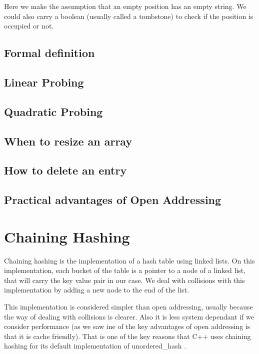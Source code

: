 Here we make the assumption that an empty position has an empty string. We could also carry a boolean (usually called a tombstone) to check if the position is occupied or not. 

\subsection{Formal definition}

\subsection{Linear Probing}

\subsection{Quadratic Probing}

\subsection{When to resize an array}

\subsection{How to delete an entry}

\subsection{Practical advantages of Open Addressing}

\section{Chaining Hashing}

Chaining hashing is the implementation of a hash table using linked lists. On this implementation, each bucket of the table is a pointer to a node of a linked list, that will carry the key value pair in our case. We deal with collisions with this implementation by adding a new node to the end of the list.

This implementation is considered simpler than open addressing, usually because the way of dealing with collisions is clearer. Also it is less system dependant if we consider performance (as we saw ine of the key advantages of open addressing is that it is cache friendly). That is one of the key reasons that C++ uses chaining hashing for its default implementation of unordered\_hash \cite{HashTableProposal}.

